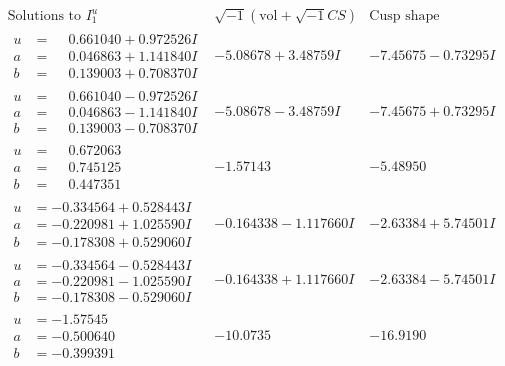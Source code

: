 \documentclass[1p]{elsarticle_modified}
\theoremstyle{definition}
\newcommand{\I}{\sqrt{-1}}
\begin{document}
$$\begin{array}{c|c|c}  
\text{Solutions to }I^u_{1}& \I (\text{vol} + \sqrt{-1}CS) & \text{Cusp shape}\\
 \hline 
\begin{aligned}
u &= \phantom{-}0.661040 + 0.972526 I \\
a &= \phantom{-}0.046863 + 1.141840 I \\
b &= \phantom{-}0.139003 + 0.708370 I\end{aligned}
 & -5.08678 + 3.48759 I & -7.45675 - 0.73295 I \\ \hline\begin{aligned}
u &= \phantom{-}0.661040 - 0.972526 I \\
a &= \phantom{-}0.046863 - 1.141840 I \\
b &= \phantom{-}0.139003 - 0.708370 I\end{aligned}
 & -5.08678 - 3.48759 I & -7.45675 + 0.73295 I \\ \hline\begin{aligned}
u &= \phantom{-}0.672063\phantom{ +0.000000I} \\
a &= \phantom{-}0.745125\phantom{ +0.000000I} \\
b &= \phantom{-}0.447351\phantom{ +0.000000I}\end{aligned}
 & -1.57143\phantom{ +0.000000I} & -5.48950\phantom{ +0.000000I} \\ \hline\begin{aligned}
u &= -0.334564 + 0.528443 I \\
a &= -0.220981 + 1.025590 I \\
b &= -0.178308 + 0.529060 I\end{aligned}
 & -0.164338 - 1.117660 I & -2.63384 + 5.74501 I \\ \hline\begin{aligned}
u &= -0.334564 - 0.528443 I \\
a &= -0.220981 - 1.025590 I \\
b &= -0.178308 - 0.529060 I\end{aligned}
 & -0.164338 + 1.117660 I & -2.63384 - 5.74501 I \\ \hline\begin{aligned}
u &= -1.57545\phantom{ +0.000000I} \\
a &= -0.500640\phantom{ +0.000000I} \\
b &= -0.399391\phantom{ +0.000000I}\end{aligned}
 & -10.0735\phantom{ +0.000000I} & -16.9190\phantom{ +0.000000I} \\ \hline\begin{aligned}

\end{aligned}
\end{array}$$
\end{document}
